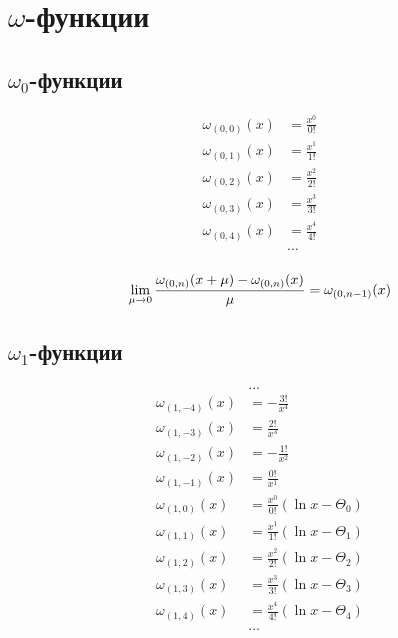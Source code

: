 
\section{$\omega$-функции}

\subsection{$\omega_0$-функции}

\begin{equation*}\begin{aligned}
\omega_{(0,0)}(x) &= \frac{x^0}{0!} \\
\omega_{(0,1)}(x) &= \frac{x^1}{1!} \\
\omega_{(0,2)}(x) &= \frac{x^2}{2!} \\
\omega_{(0,3)}(x) &= \frac{x^3}{3!} \\
\omega_{(0,4)}(x) &= \frac{x^4}{4!} \\
&\ldots \\
\end{aligned}\end{equation*}

\begin{equation*}
\lim_{\mu \to 0} \frac{\omega_{(0, n)}(x + \mu) - \omega_{(0, n)}(x)}{\mu} = \omega_{(0, n - 1)}(x) \\
\end{equation*}

\subsection{$\omega_1$-функции}

\begin{equation*} \begin{aligned}
&\ldots \\
\omega_{(1, -4)}(x) &=
- \frac{3!}{x^4} \\
\omega_{(1, -3)}(x) &=
  \frac{2!}{x^3} \\
\omega_{(1, -2)}(x) &=
- \frac{1!}{x^2} \\
\omega_{(1, -1)}(x) &=
  \frac{0!}{x^1} \\
\omega_{(1, 0)}(x) &= 
  \frac{x^0}{0!} \left(
  \ln{x} - \Theta_0 \right) \\
\omega_{(1, 1)}(x) &= 
  \frac{x^1}{1!} \left(
  \ln{x} - \Theta_1 \right) \\
\omega_{(1, 2)}(x) &= 
  \frac{x^2}{2!} \left(
  \ln{x} - \Theta_2 \right) \\
\omega_{(1, 3)}(x) &= 
  \frac{x^3}{3!} \left(
  \ln{x} - \Theta_3 \right) \\
\omega_{(1, 4)}(x) &= 
  \frac{x^4}{4!} \left(
  \ln{x} - \Theta_4 \right) \\
&\ldots \\
\end{aligned} \end{equation*}

